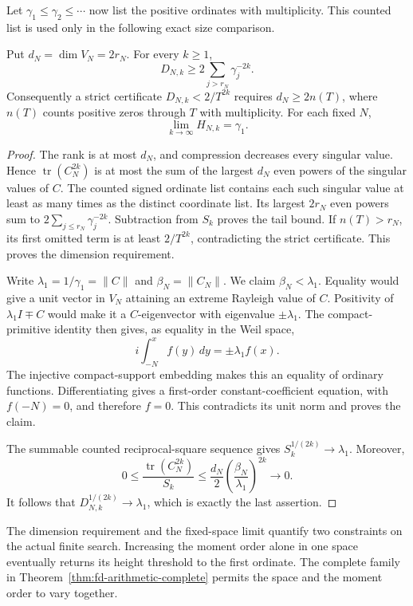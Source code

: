 Let \(\gamma_1\le\gamma_2\le\cdots\) now list the positive
ordinates with multiplicity. This counted list is used only in the
following exact size comparison.

\begin{proposition}
\label{prop:fd-certificate-size}
Put \(d_N=\dim V_N=2r_N\). For every \(k\ge1\),
\[
 D_{N,k}\ge2\sum_{j>r_N}\gamma_j^{-2k}.
\]
Consequently a strict certificate \(D_{N,k}<2/T^{2k}\)
requires \(d_N\ge2n(T)\), where \(n(T)\) counts positive
zeros through \(T\) with multiplicity. For each fixed \(N\),
\[
 \lim_{k\to\infty}H_{N,k}=\gamma_1.
\]
\end{proposition}
\begin{proof}
The rank is at most \(d_N\), and compression decreases every
singular value. Hence \(\operatorname{tr}(C_N^{2k})\) is at
most the sum of the largest \(d_N\) even powers of the singular
values of \(C\). The counted signed ordinate list contains each
such singular value at least as many times as the distinct
coordinate list. Its largest \(2r_N\) even powers sum to
\(2\sum_{j\le r_N}\gamma_j^{-2k}\). Subtraction from \(S_k\)
proves the tail bound. If \(n(T)>r_N\), its first omitted
term is at least \(2/T^{2k}\), contradicting the strict
certificate. This proves the dimension requirement.

Write \(\lambda_1=1/\gamma_1=\|C\|\) and
\(\beta_N=\|C_N\|\). We claim \(\beta_N<\lambda_1\).
Equality would give a unit vector in \(V_N\) attaining an
extreme Rayleigh value of \(C\). Positivity of
\(\lambda_1I\mp C\) would make it a \(C\)-eigenvector with
eigenvalue \(\pm\lambda_1\). The compact-primitive identity
then gives, as equality in the Weil space,
\[
 i\int_{-N}^{x}f(y)\,dy=\pm\lambda_1 f(x).
\]
The injective compact-support embedding makes this an equality
of ordinary functions. Differentiating gives a first-order
constant-coefficient equation, with \(f(-N)=0\), and therefore
\(f=0\). This contradicts its unit norm and proves the claim.

The summable counted reciprocal-square sequence gives
\(S_k^{1/(2k)}\to\lambda_1\). Moreover,
\[
 0\le\frac{\operatorname{tr}(C_N^{2k})}{S_k}
 \le\frac{d_N}{2}
       \left(\frac{\beta_N}{\lambda_1}\right)^{2k}
 \longrightarrow0.
\]
It follows that \(D_{N,k}^{1/(2k)}\to\lambda_1\), which is
exactly the last assertion.
\end{proof}

The dimension requirement and the fixed-space limit quantify two
constraints on the actual finite search. Increasing the moment
order alone in one space eventually returns its height threshold
to the first ordinate. The complete family in
Theorem~\ref{thm:fd-arithmetic-complete} permits the space and the
moment order to vary together.

